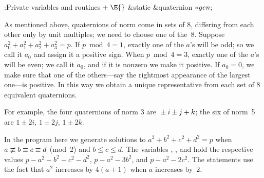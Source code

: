 \B{}:Private variables and routines\X${}\mathrel+\E{}$\6
\&{static} \&{quaternion} ${}{*}\\{gen}{}$;\par
\fi

As mentioned above, quaternions of norm  come in sets of 8,
differing from each other only by unit multiples; we need to choose one
of the~8. Suppose $a_0^2+a_1^2+a_2^2+a_3^2=p$.
If $p\bmod4=1$, exactly one of the $a$'s will be odd;
so we call it $a_0$ and assign it a positive sign. When $p\bmod4=3$, exactly
one of the $a$'s will be even; we call it $a_0$, and if it is nonzero we
make it positive. If $a_0=0$, we make sure that one of the
others---say the rightmost appearance of the largest one---is positive.
In this way we obtain a unique representative from each set of 8 equivalent
quaternions.

For example, the four quaternions of norm 3 are $\null\pm i\pm j+k$; the six
of norm~5 are $1\pm2i$, $1\pm2j$, $1\pm2k$.

In the program here we generate solutions to $a^2+b^2+c^2+d^2=p$ when
$a\not\=b\=c\=d$ (mod~2) and $b\le c\le d$. The variables , , and 
hold the respective values $p-a^2-b^2-c^2-d^2$, $p-a^2-3b^2$, and
$p-a^2-2c^2$. The  statements use the fact that $a^2$ increases
by $4(a+1)$ when $a$ increases by~2.


